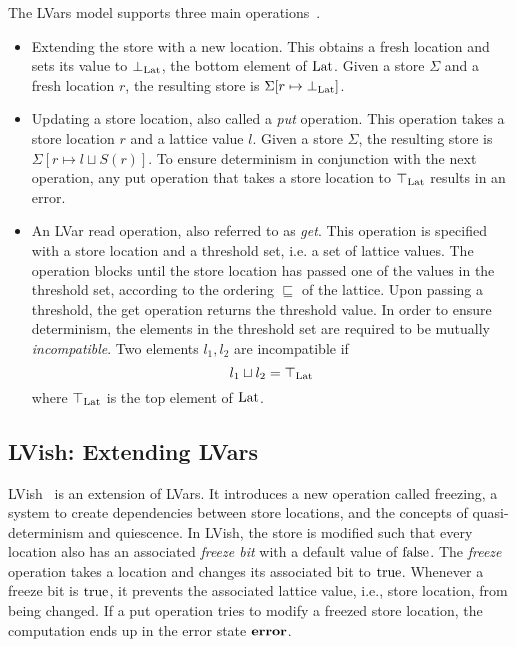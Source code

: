 The LVars model supports three main operations~\parencite{kuper2013lvars}.
\begin{itemize}
  \item Extending the store with a new location. This obtains a fresh location
    and
    sets its value to $\bot_{\mathrm{Lat}}$, the bottom element of $\mathrm{Lat}$.
    Given a store $\Sigma$ and a fresh location $r$, the resulting store is
    $\Sigma[r \mapsto \bot_{\mathrm{Lat}}]$.
  \item Updating a store location, also called a \emph{put} operation. This
    operation takes a store location $r$ and a lattice value $l$. Given a store
    $\Sigma$, the resulting store is $\Sigma[r \mapsto l\sqcup S(r)]$. To ensure
    determinism in conjunction with the next operation, any put operation that
    takes a store location to $\top_{\mathrm{Lat}}$ results in an error.
  \item An LVar read operation, also referred to as \emph{get}. This operation is
    specified with a store location and a threshold set, i.e. a set of lattice
    values. The operation blocks until the store location has passed one of the
    values in the threshold set, according to the ordering $\sqsubseteq$ of the
    lattice. Upon passing a threshold, the get operation returns the threshold
    value. In order to ensure determinism, the elements in the threshold set are
    required to be mutually \emph{incompatible}. Two elements $l_1, l_2$ are
    incompatible if
    \begin{equation*}
      l_1 \sqcup l_2 = \top_{\mathrm{Lat}}
    \end{equation*}
    where $\top_{\mathrm{Lat}}$ is the top element of $\mathrm{Lat}$.
\end{itemize}

\subsection{LVish: Extending LVars}%
\label{sub:lvish_extending_lvars}

LVish~\parencite{kuper2014freeze} is an extension of LVars. It introduces a new
operation called freezing, a system to create dependencies between store
locations, and the concepts of quasi-determinism and quiescence.  In LVish, the
store is modified such that every location also has an associated \emph{freeze
bit} with a default value of $\mathrm{false}$. The \emph{freeze} operation
takes a location and changes its associated bit to $\mathrm{true}$.  Whenever a
freeze bit is $\mathrm{true}$, it prevents the associated lattice value, i.e.,
store location, from being changed. If a put operation tries to modify a freezed
store location, the computation ends up in the error state $\mbox{{\bf error}}$.

